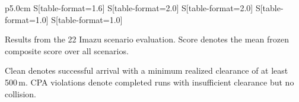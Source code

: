 \documentclass[10pt]{reportMaster}
\begin{document}
\begin{table}[t]
\begin{threeparttable}
\begin{tabular}{
p{5.0cm}
S[table-format=1.6]
S[table-format=2.0]
S[table-format=2.0]
S[table-format=1.0]
S[table-format=1.0]
}
\bottomrule
\end{tabular}

\begin{tablenotes}[flushleft]
\footnotesize
\item Results from the 22 Imazu scenario evaluation. Score denotes the mean frozen composite score over all scenarios.
\item Clean denotes successful arrival with a minimum
realized clearance of at least 500\,m.
CPA violations denote completed runs with insufficient
clearance but no collision.
\end{tablenotes}
\caption{Aggregate controller performance across the 22 IMAZU
scenarios at simulation time warp 5.}
\end{threeparttable}
\end{table}
\end{document}

